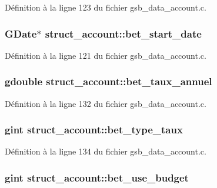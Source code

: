 Définition à la ligne 123 du fichier gsb\_\-data\_\-account.c.

\subsubsection[{bet\_\-start\_\-date}]{\setlength{\rightskip}{0pt plus 5cm}GDate$\ast$ {\bf struct\_\-account::bet\_\-start\_\-date}}\label{structstruct__account_a0055b9c4185759cc33e31984f9204adb}


Définition à la ligne 121 du fichier gsb\_\-data\_\-account.c.

\subsubsection[{bet\_\-taux\_\-annuel}]{\setlength{\rightskip}{0pt plus 5cm}gdouble {\bf struct\_\-account::bet\_\-taux\_\-annuel}}\label{structstruct__account_a61232d424b17ca7219039670d2df6251}


Définition à la ligne 132 du fichier gsb\_\-data\_\-account.c.

\subsubsection[{bet\_\-type\_\-taux}]{\setlength{\rightskip}{0pt plus 5cm}gint {\bf struct\_\-account::bet\_\-type\_\-taux}}\label{structstruct__account_a562cc45f892238d6c4a4e7df69cceda2}


Définition à la ligne 134 du fichier gsb\_\-data\_\-account.c.

\subsubsection[{bet\_\-use\_\-budget}]{\setlength{\rightskip}{0pt plus 5cm}gint {\bf struct\_\-account::bet\_\-use\_\-budget}}\label{structstruct__account_a78a4f60f01fa9018b769cdd3e93b0f44}


